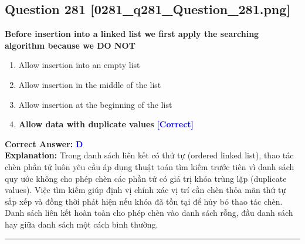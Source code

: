 \documentclass[11pt,a4paper]{article}
\begin{document}
\begin{minipage}{\textwidth}
\subsection*{Question 281 \quad \footnotesize{[0281\_q281\_Question\_281.png]}}
\noindent \textbf{Before insertion into a linked list we first apply the searching algorithm because we DO NOT}

\begin{enumerate}[label=\Alph*.]
    \item Allow insertion into an empty list
    \item Allow insertion in the middle of the list
    \item Allow insertion at the beginning of the list
    \item \textbf{Allow data with duplicate values} \hfill \textcolor{blue}{\textbf{[Correct]}}
\end{enumerate}

\noindent \textbf{Correct Answer:} \textcolor{blue}{\textbf{D}} \\[2pt]
\noindent \textbf{Explanation:} Trong danh sách liên kết có thứ tự (ordered linked list), thao tác chèn phần tử luôn yêu cầu áp dụng thuật toán tìm kiếm trước tiên vì danh sách quy ước không cho phép chèn các phần tử có giá trị khóa trùng lặp (duplicate values). Việc tìm kiếm giúp định vị chính xác vị trí cần chèn thỏa mãn thứ tự sắp xếp và đồng thời phát hiện nếu khóa đã tồn tại để hủy bỏ thao tác chèn. Danh sách liên kết hoàn toàn cho phép chèn vào danh sách rỗng, đầu danh sách hay giữa danh sách một cách bình thường.

\par\vspace{0.3cm}
\hrule
\vspace{0.3cm}
\end{minipage}
\end{document}
